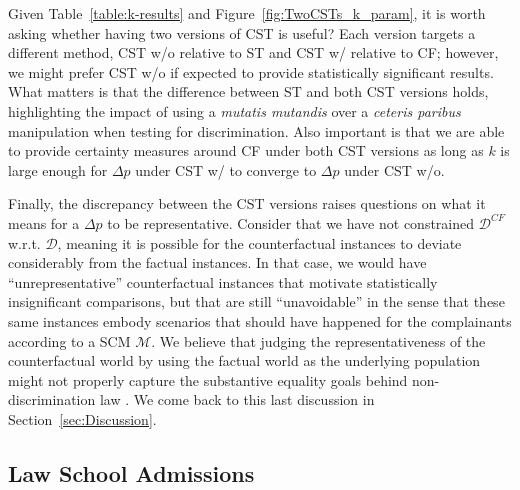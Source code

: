 Given Table~\ref{table:k-results} and Figure~\ref{fig:TwoCSTs_k_param}, it is worth asking whether having two versions of CST is useful?
Each version targets a different method, CST w/o relative to ST and CST w/ relative to CF; however, we might prefer CST w/o if expected to provide statistically significant results. 
What matters is that the difference between ST and both CST versions holds, highlighting the impact of using a \textit{mutatis mutandis} over a \textit{ceteris paribus} manipulation when testing for discrimination.
Also important is that we are able to provide certainty measures around CF under both CST versions as long as $k$ is large enough for $\Delta p$ under CST w/ to converge to $\Delta p$ under CST w/o.

Finally, the discrepancy between the CST versions raises questions on what it means for a $\Delta p$ to be representative.
Consider that we have not constrained $\mathcal{D}^{CF}$ w.r.t. $\mathcal{D}$, meaning it is possible for the counterfactual instances to deviate considerably from the factual instances. 
In that case, we would have ``unrepresentative'' counterfactual instances that motivate statistically insignificant comparisons, but that are still ``unavoidable'' in the sense that these same instances embody scenarios that should have happened for the complainants according to a SCM $\mathcal{M}$.
We believe that judging the representativeness of the counterfactual world by using the factual world as the underlying population might not properly capture the substantive equality goals behind non-discrimination law \parencite{Wachter2020BiasPreserving}. 
We come back to this last discussion in Section~\ref{sec:Discussion}.

\subsection{Law School Admissions}
\label{sec:Experiments.Real}

